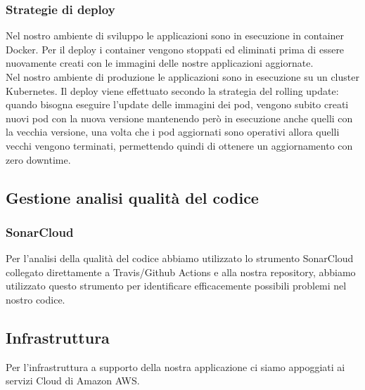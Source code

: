 \documentclass{article}
\begin{document}
\subsubsection{Strategie di deploy}
Nel nostro ambiente di sviluppo le applicazioni sono in esecuzione in container Docker. Per il deploy i container vengono stoppati ed eliminati prima di essere nuovamente creati con le immagini delle nostre applicazioni aggiornate.\\
Nel nostro ambiente di produzione le applicazioni sono in esecuzione su un cluster Kubernetes. Il deploy viene effettuato secondo la strategia del rolling update: quando bisogna eseguire l’update delle immagini dei pod, vengono subito creati nuovi pod con la nuova versione mantenendo però in esecuzione anche quelli con la vecchia versione, una volta che i pod aggiornati sono operativi allora quelli vecchi vengono terminati, permettendo quindi di ottenere un aggiornamento con zero downtime.
\subsection{Gestione analisi qualità del codice}
\subsubsection{SonarCloud}
Per l’analisi della qualità del codice abbiamo utilizzato lo strumento SonarCloud collegato direttamente a Travis/Github Actions e alla nostra repository, abbiamo utilizzato questo strumento per identificare efficacemente possibili problemi nel nostro codice.
\subsection{Infrastruttura}
Per l’infrastruttura a supporto della nostra applicazione ci siamo appoggiati ai servizi Cloud di Amazon AWS.
\end{document}
